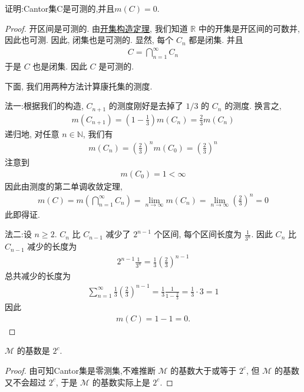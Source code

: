 \documentclass[../../main.tex]{subfiles}
\begin{document}
\begin{proposition}\label{proposition:Cantor集可测且测度为0}
证明:Cantor集C是可测的,并且$m(C)=0$.
\end{proposition}
\begin{proof}
开区间是可测的. 由\hyperref[theorem:开集构造定理]{开集构造定理}, 我们知道 \(\mathbb{R}\) 中的开集是开区间的可数并, 因此也可测. 因此, 闭集也是可测的. 显然, 每个 \(C_n\) 都是闭集. 并且
\begin{align*}
C = \bigcap_{n = 1}^{\infty} C_n
\end{align*}
于是 \(C\) 也是闭集. 因此 \(C\) 是可测的.

下面, 我们用两种方法计算康托集的测度.

{\color{blue}法一:}根据我们的构造, \(C_{n + 1}\) 的测度刚好是去掉了 \(1/3\) 的 \(C_n\) 的测度. 换言之,
\begin{align*}
m(C_{n + 1}) = \left(1 - \frac{1}{3}\right)m(C_n) = \frac{2}{3}m(C_n)
\end{align*}
递归地, 对任意 \(n \in \mathbb{N}\), 我们有
\begin{align*}
m(C_n) = \left(\frac{2}{3}\right)^n m(C_0) = \left(\frac{2}{3}\right)^n
\end{align*}
注意到
\begin{align*}
m(C_0) = 1 < \infty
\end{align*}
因此由测度的第二单调收敛定理,
\begin{align*}
m(C) = m\left(\bigcap_{n = 1}^{\infty} C_n\right) = \lim_{n \to \infty} m(C_n) = \lim_{n \to \infty} \left(\frac{2}{3}\right)^n = 0
\end{align*}
此即得证.

{\color{blue}法二:}设 \(n \geqslant  2\). \(C_n\) 比 \(C_{n - 1}\) 减少了 \(2^{n - 1}\) 个区间, 每个区间长度为 \(\frac{1}{3^n}\). 因此 \(C_n\) 比 \(C_{n - 1}\) 减少的长度为
\begin{align*}
2^{n - 1}\frac{1}{3^n} = \frac{1}{3}\left(\frac{2}{3}\right)^{n - 1}
\end{align*}
总共减少的长度为
\begin{align*}
\sum_{n = 1}^{\infty} \frac{1}{3}\left(\frac{2}{3}\right)^{n - 1} = \frac{1}{3} \frac{1}{1 - \frac{2}{3}} = \frac{1}{3} \cdot 3 = 1
\end{align*}
因此
\begin{align*}
m(C) = 1 - 1 = 0.
\end{align*} 
\end{proof}

\begin{proposition}\label{proposition:可测集类的基数是2^c}
\(\mathscr{M}\) 的基数是 \(2^c\).
\end{proposition}
\begin{proof}
由可知Cantor集是零测集,不难推断 \(\mathscr{M}\) 的基数大于或等于 \(2^c\), 但 \(\mathscr{M}\) 的基数又不会超过 \(2^c\), 于是 \(\mathscr{M}\) 的基数实际上是 \(2^c\). 
\end{proof}
\end{document}

